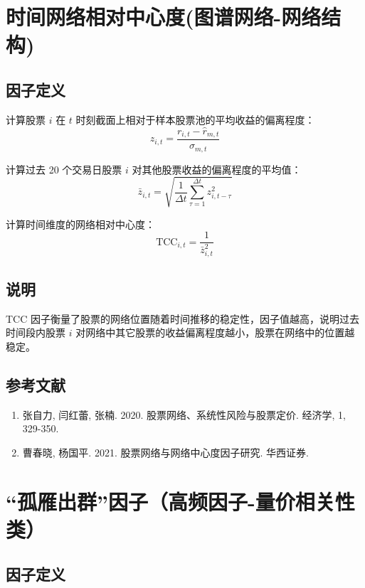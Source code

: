 \documentclass{article}
\begin{document}
\section{时间网络相对中心度(图谱网络-网络结构)}

\subsection{因子定义}


计算股票 \( i \) 在 \( t \) 时刻截面上相对于样本股票池的平均收益的偏离程度：
\begin{equation}
    z_{i,t} = \frac{r_{i,t} - \hat{r}_{m,t}}{\sigma_{m,t}}
\end{equation}

计算过去 20 个交易日股票 \( i \) 对其他股票收益的偏离程度的平均值：
\begin{equation}
    \bar{z}_{i,t} = \sqrt{\frac{1}{\Delta t} \sum_{\tau=1}^{\Delta t} z_{i,t-\tau}^2}
\end{equation}

计算时间维度的网络相对中心度：
\begin{equation}
    \mathrm{TCC}_{i,t} = \frac{1}{\bar{z}_{i,t}^2}
\end{equation}

\subsection{说明}
TCC 因子衡量了股票的网络位置随着时间推移的稳定性，因子值越高，说明过去时间段内股票 \( i \) 对网络中其它股票的收益偏离程度越小，股票在网络中的位置越稳定。

\subsection{参考文献}
\begin{enumerate}
    \item 张自力, 闫红蕾, 张楠. 2020. 股票网络、系统性风险与股票定价. 经济学, 1, 329-350.
    \item 曹春晓, 杨国平. 2021. 股票网络与网络中心度因子研究. 华西证券.
\end{enumerate}

\section{“孤雁出群”因子（高频因子-量价相关性类）}

\subsection{因子定义}
\end{document}
